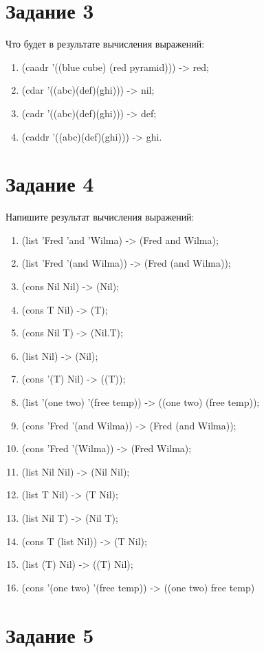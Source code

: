\documentclass[a4paper, 12pt]{article}
\begin{document}
\section*{Задание 3}
Что будет в результате вычисления выражений:
\begin{enumerate}
	\item (caadr '((blue cube) (red pyramid))) -> red;
	\item (cdar '((abc)(def)(ghi))) -> nil;
	\item (cadr '((abc)(def)(ghi))) -> def;
	\item (caddr '((abc)(def)(ghi))) -> ghi.
\end{enumerate}

\section*{Задание 4}
Напишите результат вычисления выражений:
\begin{enumerate}
	\item (list 'Fred 'and 'Wilma) -> (Fred and Wilma);
	\item (list 'Fred '(and Wilma)) -> (Fred (and Wilma));
	\item (cons Nil Nil) -> (Nil);
	\item (cons T Nil) -> (T);
	\item (cons Nil T) -> (Nil.T);
	\item (list Nil) -> (Nil);
	\item (cons '(T) Nil) -> ((T));
	\item (list '(one two) '(free temp)) -> ((one two) (free temp));
	\item (cons 'Fred '(and Wilma)) -> (Fred (and Wilma));
	\item (cons 'Fred '(Wilma)) -> (Fred Wilma);
	\item (list Nil Nil) -> (Nil Nil);
	\item (list T Nil) -> (T Nil);
	\item (list Nil T) -> (Nil T);
	\item (cons T (list Nil)) -> (T Nil);
	\item (list (T) Nil) -> ((T) Nil);
	\item (cons '(one two) '(free temp)) -> ((one two) free temp)
\end{enumerate}

\section*{Задание 5}
\end{document}
